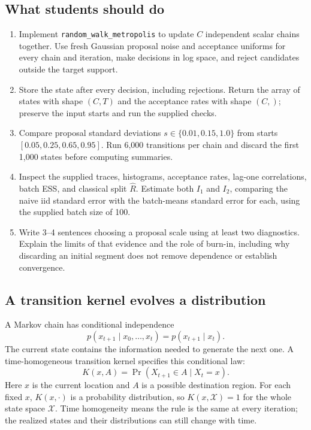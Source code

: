 \documentclass[11pt,a4paper]{article}
\begin{document}
\subsection{What students should do}
\begin{enumerate}
\item Implement \texttt{random\_walk\_metropolis} to update $C$ independent
scalar chains together. Use fresh Gaussian proposal noise and acceptance
uniforms for every chain and iteration, make decisions in log space, and
reject candidates outside the target support.
\item Store the state after every decision, including rejections. Return
the array of states with shape $(C,T)$ and the acceptance rates with shape
$(C,)$; preserve the input starts and run the supplied checks.
\item Compare proposal standard deviations $s\in\{0.01,0.15,1.0\}$ from
starts $[0.05,0.25,0.65,0.95]$. Run 6,000 transitions per chain and discard
the first 1,000 states before computing summaries.
\item Inspect the supplied traces, histograms, acceptance rates, lag-one
correlations, batch ESS, and classical split $\widehat R$. Estimate both
$I_1$ and $I_2$, comparing the naive iid standard error with the
batch-means standard error for each, using the supplied batch size of 100.
\item Write 3--4 sentences choosing a proposal scale using at least two
diagnostics. Explain the limits of that evidence and the role of burn-in,
including why discarding an initial segment does not remove dependence or
establish convergence.
\end{enumerate}

\subsection{A transition kernel evolves a distribution}
A Markov chain has conditional independence
\[
 p(x_{t+1}\mid x_0,\ldots,x_t)=p(x_{t+1}\mid x_t).
\]
The current state contains the information needed to generate the next one.
A time-homogeneous transition kernel specifies this conditional law:
\[
 K(x,A)=\Pr(X_{t+1}\in A\mid X_t=x).
\]
Here $x$ is the current location and $A$ is a possible destination region.
For each fixed $x$, $K(x,\cdot)$ is a probability distribution, so
$K(x,\mathcal X)=1$ for the whole state space $\mathcal X$.
Time homogeneity means the rule is the same at every iteration; the realized
states and their distributions can still change with time.
\end{document}
